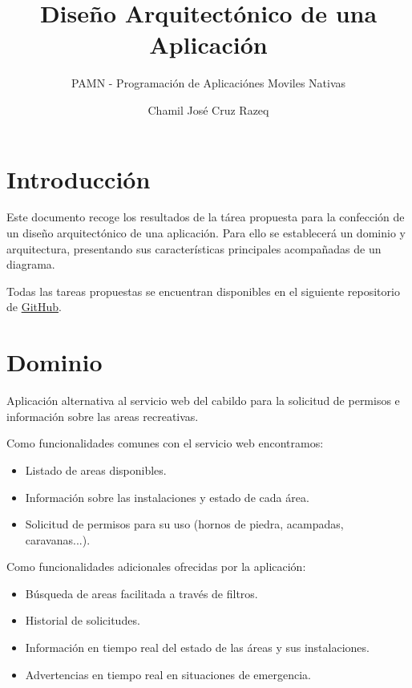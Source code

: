 \documentclass{scrartcl}
\title{Diseño Arquitectónico de una Aplicación}
\subtitle{\large PAMN - Programación de Aplicaciónes Moviles Nativas}
\author{Chamil José Cruz Razeq}
\begin{document}
    \maketitle
    \thispagestyle{empty}
    \newpage
    \tableofcontents
    \newpage

    \section{Introducción}
        Este documento recoge los resultados de la tárea propuesta para la
         confección de un diseño arquitectónico de una aplicación. Para ello
         se establecerá un dominio y arquitectura, presentando sus características
         principales acompañadas de un diagrama.

        Todas las tareas propuestas se encuentran disponibles en el siguiente
         repositorio de \href{https://github.com/chamilstudy/ulpgc_pamn_labs}{GitHub}.
    
    \section{Dominio}
        Aplicación alternativa al servicio web del cabildo para la solicitud de
         permisos e información sobre las areas recreativas.
        
        Como funcionalidades comunes con el servicio web encontramos:
        \begin{itemize}
            \item Listado de areas disponibles.
            \item Información sobre las instalaciones y estado de cada área.
            \item Solicitud de permisos para su uso (hornos de piedra, acampadas, caravanas...).
        \end{itemize}

        Como funcionalidades adicionales ofrecidas por la aplicación:
        \begin{itemize}
            \item Búsqueda de areas facilitada a través de filtros.
            \item Historial de solicitudes.
            \item Información en tiempo real del estado de las áreas y sus instalaciones.
            \item Advertencias en tiempo real en situaciones de emergencia.
        \end{itemize}
    
\end{document}
